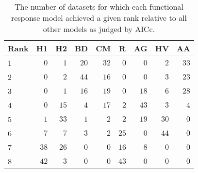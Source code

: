 \begin{table}[!tbp]
\caption{The number of datasets for which each functional response model achieved a given rank relative to all other models as judged by AICc.\label{table:AICc_rankings}} 
\begin{center}
\begin{tabular}{lrrrrrrrr}
\hline\hline
\multicolumn{1}{l}{Rank}&\multicolumn{1}{c}{H1}&\multicolumn{1}{c}{H2}&\multicolumn{1}{c}{BD}&\multicolumn{1}{c}{CM}&\multicolumn{1}{c}{R}&\multicolumn{1}{c}{AG}&\multicolumn{1}{c}{HV}&\multicolumn{1}{c}{AA}\tabularnewline
\hline
1&$ 0$&$ 1$&$20$&$32$&$ 0$&$ 0$&$ 2$&$33$\tabularnewline
2&$ 0$&$ 2$&$44$&$16$&$ 0$&$ 0$&$ 3$&$23$\tabularnewline
3&$ 0$&$ 1$&$16$&$19$&$ 0$&$18$&$ 6$&$28$\tabularnewline
4&$ 0$&$15$&$ 4$&$17$&$ 2$&$43$&$ 3$&$ 4$\tabularnewline
5&$ 1$&$33$&$ 1$&$ 2$&$ 2$&$19$&$30$&$ 0$\tabularnewline
6&$ 7$&$ 7$&$ 3$&$ 2$&$25$&$ 0$&$44$&$ 0$\tabularnewline
7&$38$&$26$&$ 0$&$ 0$&$16$&$ 8$&$ 0$&$ 0$\tabularnewline
8&$42$&$ 3$&$ 0$&$ 0$&$43$&$ 0$&$ 0$&$ 0$\tabularnewline
\hline
\end{tabular}\end{center}
\end{table}
